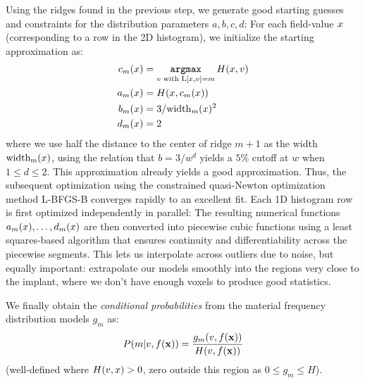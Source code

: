 Using the ridges found in the previous step, we generate good starting
guesses and constraints for the distribution parameters
$a,b,c,d$:
For each field-value $x$ (corresponding to a row in the 2D histogram),
we initialize the starting approximation as:
\begin{equation}
  \label{eq:starting-guesses}
  \begin{split}
    c_m(x) &= \mathop{\mathtt{argmax}}_{v \text{ with }\mathrm{L}[x,v] = m} H(x,v)    \\    
    a_m(x) &= H(x,c_m(x))\\
    b_m(x) &= 3/\mathrm{width}_m(x)^2 \\
    d_m(x) &= 2
  \end{split}
\end{equation}
where we use half the distance to the center of ridge $m+1$ as the width
$\mathrm{width_m}(x)$, using the relation that $b = 3/w^d$ yields
a $5\%$ cutoff at $w$ when $1\le d \le 2$. This approximation
already yields a good approximation. Thus, the subsequent
optimization using the constrained quasi-Newton optimization method L-BFGS-B\cite{BFGS}
converges rapidly to an excellent fit. Each 1D histogram row is first optimized
independently in parallel: The resulting numerical functions
$a_m(x),\ldots,d_m(x)$ are then converted into piecewise cubic
functions using a least squares-based algorithm that ensures continuity
and differentiability across the piecewise segments. This lets us interpolate across
outliers due to noise, but equally important:
extrapolate our models smoothly into the regions very close to the implant, where
we don't have enough voxels to produce good statistics.

We finally obtain the {\em conditional probabilities} from the material frequency distribution
models $g_m$ as:
\begin{equation}
  \label{eq:Pm}
  P(m|v,f(\mathbf{x})) = \frac{g_m(v,f(\mathbf{x}))}{H(v,f(\mathbf{x}))} 
\end{equation}
(well-defined where $H(v,x) > 0$, zero outside this region as $0\le g_m \le H$).



